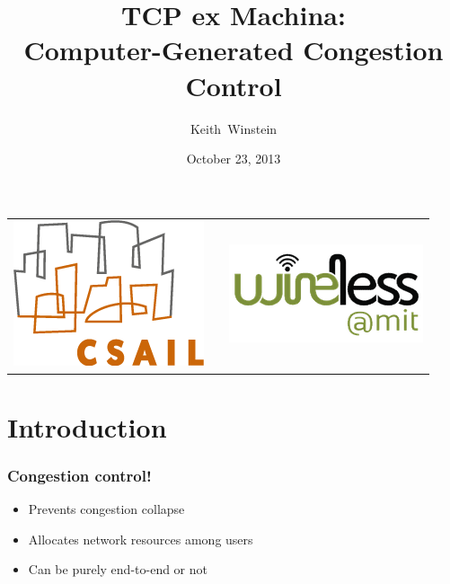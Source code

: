 \documentclass[svgnames]{beamer}
\title{TCP ex Machina: \\Computer-Generated Congestion Control}
\author{Keith~Winstein}
\institute{MIT CSAIL \& Wireless@MIT\\\vspace{\baselineskip}\textcolor{DarkBlue}{http://web.mit.edu/remy}}
\date{October 23, 2013}
\begin{document}
\begin{frame}[plain]

\titlepage

\noindent \begin{tabular}{lp{5.5 cm}r}

\includegraphics[width=1.75 cm]{csaillogomed.png}
& & \includegraphics[width=2 cm]{wirelessmitlogo.png} \\

\end{tabular}

\end{frame}


\section{Introduction}

\begin{frame}
\frametitle{Congestion control!}

\begin{itemize}

\Large

\item Prevents congestion collapse

\item Allocates network resources among users

\item Can be purely end-to-end or not

\end{itemize}

\end{frame}
\end{document}
